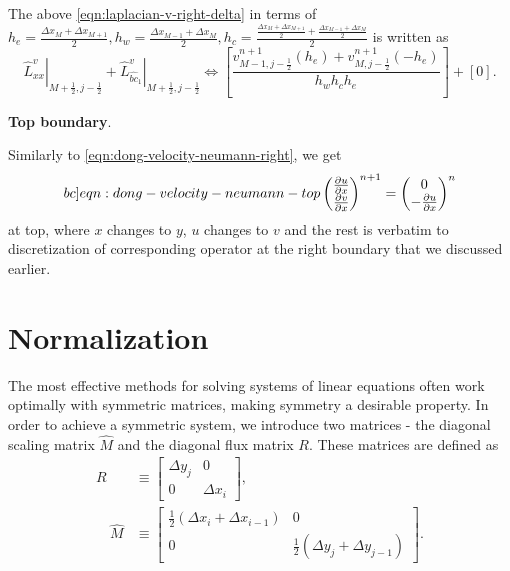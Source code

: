 \documentclass{article}
\numberwithin{equation}{section}
\begin{document}
The above \cref{eqn:laplacian-v-right-delta} in terms of $h_e=\frac{\Delta x_{M} + \Delta x_{M+1}}{2},h_w=\frac{\Delta x_{M-1} + \Delta x_M}{2},h_c=\frac{\frac{\Delta x_M + \Delta x_{M+1}}{2}+\frac{\Delta x_{M-1} + \Delta x_{M}}{2}}{2}$ is written as
\begin{equation}\label{eqn:laplacian-v-right}
	\left.\hat{L}^v_{xx}\right|_{M+\frac{1}{2},j-\frac{1}{2}}+\left.\hat{L}^v_{\hat{bc}_1}\right|_{M+\frac{1}{2},j-\frac{1}{2}}
	\iff 
	\left[\frac{
	v^{n+1}_{M-1,j-\frac{1}{2}}\left(h_e\right)
	+v^{n+1}_{M,j-\frac{1}{2}}\left(-h_e\right)
}
{ h_w h_c h_e }\right]+\left[0\right].
\end{equation}



\textbf{Top boundary}.



Similarly to \cref{eqn:dong-velocity-neumann-right}, we get 
\begin{equation}\label[bc]{eqn:dong-velocity-neumann-top}
\begin{pmatrix}{}
	\frac{\partial{u}}{\partial x}\\
	\frac{\partial{v}}{\partial x}
\end{pmatrix}^{n+1}
=	
\begin{pmatrix}
	0\\
	 -\frac{\partial u}{\partial x}
\end{pmatrix}^n
\end{equation} 
at top, where $x$ changes to $y$, $u$ changes to $v$ and the rest is verbatim to discretization of corresponding operator at the right boundary that we discussed earlier.






\pagebreak
\section{Normalization}\label{sec:normalization}

The most effective methods for solving systems of linear equations often work optimally with symmetric matrices, making symmetry a desirable property. In order to achieve a symmetric system, we introduce two matrices - the diagonal scaling matrix $\hat{M}$ and the diagonal flux matrix $R$. These matrices are defined as
\begin{align*}
R &\equiv\left[\begin{array}{cc}
\Delta y_j & 0 \\
0 & \Delta x_i
\end{array}\right], \\
\quad \hat{M} & \equiv\left[\begin{array}{cc}
\frac{1}{2}\left(\Delta x_i+\Delta x_{i-1}\right) & 0 \\
0 & \frac{1}{2}\left(\Delta y_j+\Delta y_{j-1}\right)
\end{array}\right].
\end{align*}
\end{document}
